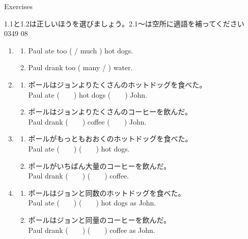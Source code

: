 \documentclass[aspectratio=169,xcolor={dvipsnames,table}]{beamer}
\begin{document}
\begin{frame}[plain]{Exercises}

{\small 1.1と1.2は正しいほうを選びましょう。2.1～は空所に適語を補ってください}%
\hfill{\tiny 0349}\,{\scriptsize {}\,08}
 \begin{enumerate}
  \item \begin{enumerate}
	 \item<1-> Paul ate too (  / much ) hot dogs.
	 \item<1-> Paul drank too ( many / ) water.
	\end{enumerate}
  \item \begin{enumerate}
	 \item<1-> ポールはジョンよりたくさんのホットドッグを食べた。\\
	       Paul ate (~~~~) hot dogs (~~~~) John.
	 \item<1-> ポールはジョンよりたくさんのコーヒーを飲んだ。\\
	       Paul drank (~~~~) coffee (~~~~) John.
	\end{enumerate}
  \item \begin{enumerate}
	 \item<1-> ポールがもっともおおくのホットドッグを食べた。\\
	       Paul ate (~~~~) (~~~~) hot dogs.
	 \item<1-> ポールがいちばん大量のコーヒーを飲んだ。\\
	       Paul drank (~~~~) (~~~~) coffee.
	\end{enumerate}
  \item \begin{enumerate}
	 \item<1-> ポールはジョンと同数のホットドッグを食べた。\\
	       Paul ate (~~~~) (~~~~) hot dogs as John.
	 \item<1-> ポールはジョンと同量のコーヒーを飲んだ。\\
	       Paul drank (~~~~) (~~~~) coffee as John.
	\end{enumerate}
 \end{enumerate}
\end{frame}
\end{document}
